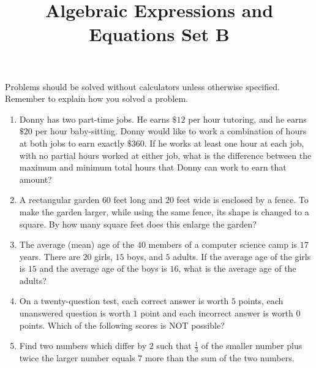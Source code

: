 \documentclass{article}
\title{Algebraic Expressions and Equations Set B}
\author{}
\date{}
\begin{document}
    \maketitle
    \noindent Problems should be solved without calculators unless otherwise specified. Remember to explain how you solved a problem.
    \begin{enumerate}
        \item Donny has two part-time jobs. He earns $\$12$ per hour tutoring, and he earns $\$20$ per hour baby-sitting. Donny would like to work a combination of hours at both jobs to earn exactly $\$360$. If he works at least one hour at each job, with no partial hours worked at either job, what is the difference between the maximum and minimum total hours that Donny can work to earn that amount?
        \vspace{3cm}
        \item A rectangular garden $60$ feet long and $20$ feet wide is enclosed by a fence. To make the garden larger, while using the same fence, its shape is changed to a square. By how many square feet does this enlarge the garden?
        \vspace{3cm}
        \item The average (mean) age of the $40$ members of a computer science camp is $17$ years. There are $20$ girls, $15$ boys, and $5$ adults. If the average age of the girls is $15$ and the average age of the boys is $16$, what is the average age of the adults?
        \vspace{3cm}
        \item On a twenty-question test, each correct answer is worth $5$ points, each unanswered question is worth $1$ point and each incorrect answer is worth $0$ points. Which of the following scores is NOT possible?
        \vspace{3cm}
        \item Find two numbers which differ by $2$ such that $\frac{1}{3}$ of the smaller number plus twice the larger number equals $7$ more than the sum of the two numbers.
        \vspace{3cm}
    \end{enumerate}
\end{document}
